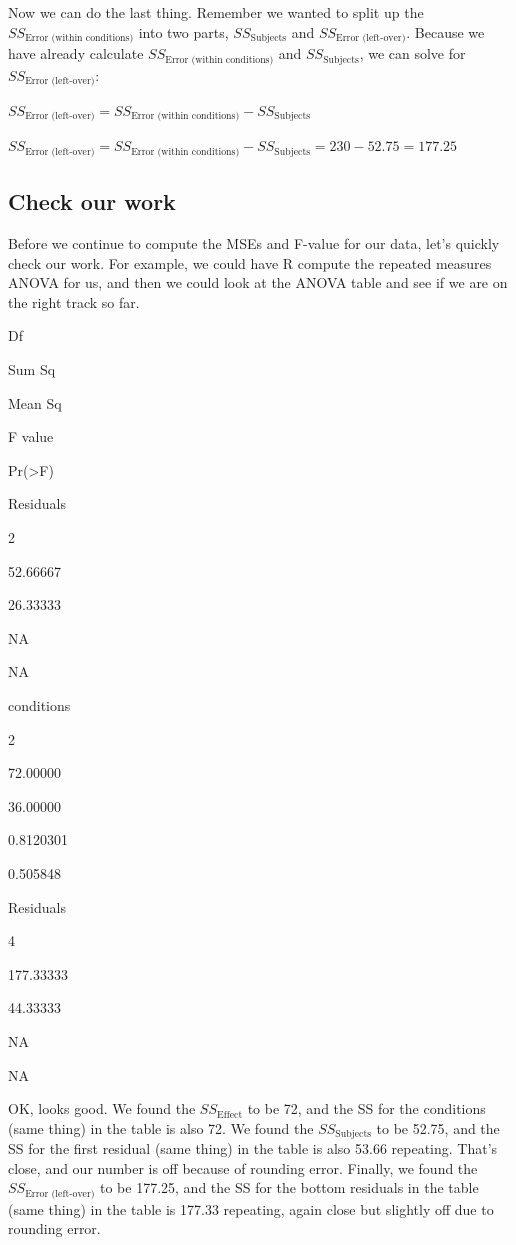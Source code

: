 \documentclass[]{book}
\begin{document}
Now we can do the last thing. Remember we wanted to split up the \(SS_\text{Error (within conditions)}\) into two parts, \(SS_\text{Subjects}\) and \(SS_\text{Error (left-over)}\). Because we have already calculate \(SS_\text{Error (within conditions)}\) and \(SS_\text{Subjects}\), we can solve for \(SS_\text{Error (left-over)}\):

\(SS_\text{Error (left-over)} = SS_\text{Error (within conditions)} - SS_\text{Subjects}\)

\(SS_\text{Error (left-over)} = SS_\text{Error (within conditions)} - SS_\text{Subjects} = 230 - 52.75 = 177.25\)

\hypertarget{check-our-work}{%
\subsection{Check our work}\label{check-our-work}}

Before we continue to compute the MSEs and F-value for our data, let's quickly check our work. For example, we could have R compute the repeated measures ANOVA for us, and then we could look at the ANOVA table and see if we are on the right track so far.

Df

Sum Sq

Mean Sq

F value

Pr(\textgreater{}F)

Residuals

2

52.66667

26.33333

NA

NA

conditions

2

72.00000

36.00000

0.8120301

0.505848

Residuals

4

177.33333

44.33333

NA

NA

OK, looks good. We found the \(SS_\text{Effect}\) to be 72, and the SS for the conditions (same thing) in the table is also 72. We found the \(SS_\text{Subjects}\) to be 52.75, and the SS for the first residual (same thing) in the table is also 53.66 repeating. That's close, and our number is off because of rounding error. Finally, we found the \(SS_\text{Error (left-over)}\) to be 177.25, and the SS for the bottom residuals in the table (same thing) in the table is 177.33 repeating, again close but slightly off due to rounding error.
\end{document}
